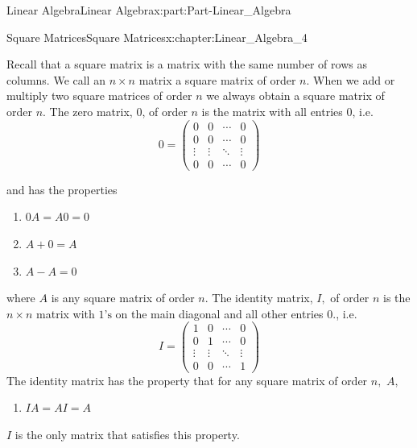 \documentclass[oneside,10pt,]{book}
\numberwithin{equation}{section}
\newcommand{\amp}{&}
\begin{document}
\begin{partptx}{Linear Algebra}{}{Linear Algebra}{}{}{x:part:Part-Linear_Algebra}
%
\begin{chapterptx}{Square Matrices}{}{Square Matrices}{}{}{x:chapter:Linear_Algebra_4}
\begin{introduction}{}%
Recall that a square matrix is a matrix with the same number of rows as columns. We call an \(n\times n \)  matrix a square matrix of order \(n \). When we add or multiply two square matrices of order \(n \) we always obtain a square matrix of order \(n \). The zero matrix, \(0 \), of order \(n \) is the  matrix with all entries \(0 \), i.e.%
\begin{equation*}
0 = 
\begin{pmatrix}
0 \amp 0 \amp \cdots \amp 0 \\
0 \amp 0 \amp \cdots \amp 0 \\
\vdots  \amp \vdots  \amp \ddots \amp \vdots  \\
0 \amp 0 \amp \cdots \amp 0 
\end{pmatrix}
\end{equation*}
%
\par
and has the properties%
\begin{enumerate}[label=\arabic*]
\item{}\(\displaystyle 0A=A0=0 \)%
\item{}\(\displaystyle A+0=A \)%
\item{}\(\displaystyle A-A=0 \)%
\end{enumerate}
%
\par
where \(A \) is any square matrix of order \(n \). The identity matrix, \(I, \) of order \(n \)  is the \(n\times n \) matrix with \(1\text{'s} \) on the main diagonal and all other entries \(0 \)., i.e.%
\begin{equation*}
I = 
\begin{pmatrix}
1 \amp 0 \amp \cdots \amp 0 \\
0 \amp 1 \amp \cdots \amp 0 \\
\vdots  \amp \vdots  \amp \ddots \amp \vdots  \\
0 \amp 0 \amp \cdots \amp 1 
\end{pmatrix}
\end{equation*}
The identity matrix has the property that for any square matrix of order \(n, \) \(A, \)%
\begin{enumerate}[label=\arabic*]
\item{}\(\displaystyle IA=AI=A \)%
\end{enumerate}
\(I \) is the only matrix that satisfies this property.%
\end{introduction}%

\end{chapterptx}
\end{partptx}
\end{document}
